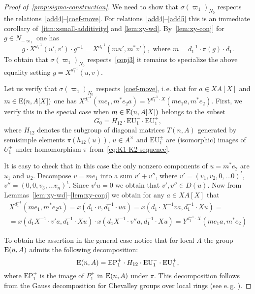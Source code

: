 \begin{proof}[Proof of~\cref{prop:sigma-construction}]
    We need to show that $\sigma(\varpi_1)_{N_0}$ respects the relations~\eqref{add4}--\eqref{coef-move}.
    For relations~\eqref{add4}--\eqref{add5} this is an immediate corollary of~\cref{itm:xsmall-additivity} and \cref{lem:xy-wd}.
    By~\cref{lem:xy-conj} for $g \in N_{-\varpi_1}$ one has
    \begin{equation}
        \label{eq:xy-conj-n1}
        g \cdot X^{d_1^{-1}}(u', v') \cdot g^{-1} = X^{d_1^{-1}}(mu', m^*v'), \text{ where } m = d_1^{-1} \cdot \pi(g) \cdot d_1.
    \end{equation}
    To obtain that $\sigma(\varpi_1)_{N_0}$ respects~\eqref{conj3} it remains to specialize the above equality setting $g = X^{d_1^{-1}}(u, v)$.

    Let us verify that $\sigma(\varpi_1)_{N_0}$ respects~\eqref{coef-move}, i.\,e. that for $a\in XA[X]$ and $m \in \operatorname{E}(n, A[X])$ one has
    $X^{d_1^{-1}}(me_1, m^*e_2 a) = Y^{d_1^{-1} \cdot X}(me_1 a, m^* e_2)$.
    First, we verify this in the special case when $m \in \operatorname{E}(n, A[X])$ belongs to the subset
    \[G_0 = H_{12} \cdot \mathrm{EU}^-_1 \cdot \mathrm{EU}^+_1,\]
    where $H_{12}$ denotes the subgroup of diagonal matrices $T(n, A)$ generated by semisimple elements $\pi(h_{12}(u))$, $u \in A^\times$
     and $\mathrm{EU}^\pm_1$ are (isomorphic) images of $U^\pm_1$ under homomorphism $\pi$ from~\eqref{eq:K1-K2-sequence}.

    It is easy to check that in this case the only nonzero components of $u = m^* e_2$ are $u_1$ and $u_2$.
    Decompose $v = m e_1$ into a sum $v' + v''$, where $v' = (v_1, v_2, 0, \ldots 0)^t,$ $v'' = (0, 0, v_3, \ldots v_n)^t$.
    Since $v^t u = 0$ we obtain that $v', v'' \in D(u)$.
    Now from Lemmas~\ref{lem:xy-wd}--\ref{lem:xy-conj} we obtain for any $a \in XA[X]$ that
    \begin{multline}
        \label{eq:special-case}
        X^{d_1^{-1}}(me_1, m^*e_2 a) =
        x(d_1 \cdot v, d_{1}^{-1} \cdot u a) =
        x(d_1 \cdot X^{-1} va, d_1^{-1} \cdot X u) = \\
        = x(d_1 X^{-1} \cdot v'a, d_1^{-1}\cdot X u) \cdot x(d_1 X^{-1}\cdot v''a, d_1^{-1} \cdot X u) =
        Y^{d_1^{-1} \cdot X}(me_{1}a, m^* e_2)
    \end{multline}

    To obtain the assertion in the general case notice that for local $A$ the group $\operatorname{E}(n, A)$ admits the following decomposition:
    \[\operatorname{E}(n, A) = \mathrm{EP}_1^+ \cdot H_{12} \cdot \mathrm{EU}^-_1 \cdot \mathrm{EU}^+_1, \]
    where $\mathrm{EP}_1^+$ is the image of $P_1^+$ in $\operatorname{E}(n, A)$ under $\pi$.
    This decomposition follows from the Gauss decomposition for Chevalley groups over local rings (see e.\,g. \cite[Theorem~1.1]{Sm12}).


\end{proof}
